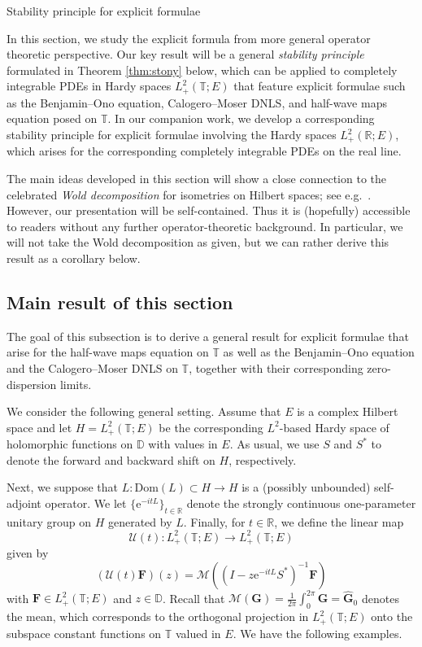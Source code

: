 \documentclass[10pt,reqno,a4paper]{amsart}
\makeatletter
\theoremstyle{definition}
\theoremstyle{remark}
\theoremstyle{remark}
\numberwithin{equation}{section}
\newcommand{\R}{\mathbb{R}}
\newcommand{\T}{\mathbb{T}}
\newcommand{\D}{\mathbb{D}}
\newcommand{\Mean}{\mathscr{M}}
\newcommand{\dom}{\mathrm{Dom}}
\newcommand{\eu}{\mathrm{e}}
\newcommand{\Fb}{\mathbf{F}}
\newcommand{\Gb}{\mathbf{G}}
\newcommand{\id}{I}
\newcommand{\Us}{\mathscr{U}}
\def\section{\@startsection{section}{1}%
  \z@{1.5\linespacing\@plus\linespacing}{.5\linespacing}%
  {\normalfont\bfseries\large\centering}}
\makeatother
\begin{document}
\section{Stability principle for explicit formulae}

In this section, we study the explicit formula from more general operator theoretic perspective. Our key result will be a general {\em stability principle} formulated in Theorem \ref{thm:stony} below, which can be applied to completely integrable PDEs in Hardy spaces $L^2_+(\T;E)$ that feature explicit formulae such as the Benjamin--Ono equation, Calogero--Moser DNLS, and half-wave maps equation posed on $\T$. In our companion work, we develop a corresponding stability principle for explicit formulae involving the Hardy spaces $L^2_+(\R;E)$, which arises for the corresponding completely integrable PDEs on the real line.

The main ideas developed in this section will show a close connection to the celebrated {\em Wold decomposition} for isometries on Hilbert spaces; see e.g.~\cite{SzFoBeKe-10, Ni-86}. However, our presentation will be self-contained. Thus it is (hopefully) accessible to readers without any further operator-theoretic background. In particular, we will not take the Wold decomposition as given, but we can rather derive this result as a corollary below.

\subsection{Main result of this section}
The goal of this subsection is to derive a general result for explicit formulae that arise for the half-wave maps equation on $\T$ as well as the Benjamin--Ono equation and the Calogero--Moser DNLS on $\T$, together with their corresponding zero-dispersion limits. 

We consider the following general setting. Assume that $E$ is a complex Hilbert space and let $H=L^2_+(\T;E)$ be the corresponding $L^2$-based Hardy space of holomorphic functions on $\D$ with values in $E$. As usual, we use $S$ and $S^*$ to denote the forward and backward shift on $H$, respectively.

Next, we suppose that $L : \dom(L) \subset H \to H$ is a (possibly unbounded) self-adjoint operator. We let $\{ \eu^{-it L} \}_{t \in \R}$ denote the strongly continuous one-parameter unitary group on $H$ generated by $L$.  Finally, for $t \in \R$, we define the linear map
$$
\Us(t) : L^2_+(\T;E) \to L^2_+(\T;E)
$$
given by
$$
(\Us(t) \Fb)(z) = \Mean \left ( (\id-z \eu^{-itL} S^*)^{-1} \Fb \right )
$$
with $\Fb \in L^2_+(\T;E)$ and $z \in \D$. Recall that $\Mean(\Gb) = \frac{1}{2 \pi} \int_0^{2 \pi} \Gb  = \widehat{\Gb}_0$ denotes the mean, which corresponds to the orthogonal projection in $L^2_+(\T;E)$ onto the subspace constant functions on $\T$ valued in $E$. We have the following examples.
\end{document}
